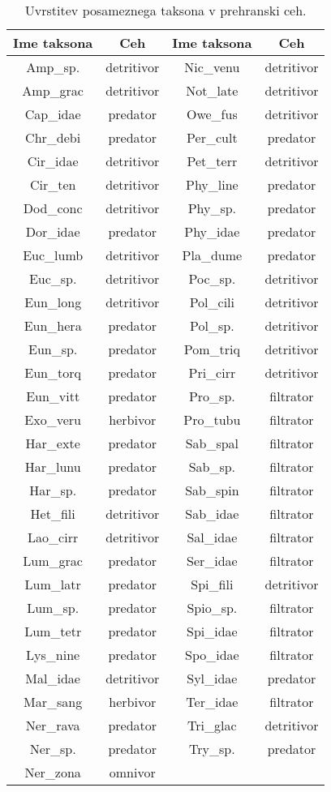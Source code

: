 \begin{table}[htb]\footnotesize
\begin{center}
\caption[Prehranski cehi]{Uvrstitev posameznega taksona v prehranski ceh.}
\label{tab:raw_cehi}
 \begin{tabular}{c c c c}
 \toprule
Ime taksona & Ceh & Ime taksona & Ceh \\
 \midrule
Amp\_sp. & detritivor & Nic\_venu & detritivor \\
Amp\_grac & detritivor & Not\_late & detritivor \\
Cap\_idae & predator & Owe\_fus &	detritivor \\
Chr\_debi & predator & Per\_cult & predator \\
Cir\_idae & detritivor & Pet\_terr & detritivor \\
Cir\_ten & detritivor & Phy\_line	& predator \\
Dod\_conc & detritivor & Phy\_sp.	& predator \\
Dor\_idae & predator & Phy\_idae & predator \\
Euc\_lumb & detritivor & Pla\_dume & predator \\
Euc\_sp. & detritivor & Poc\_sp. & detritivor \\
Eun\_long & detritivor & Pol\_cili & detritivor \\
Eun\_hera & predator & Pol\_sp. & detritivor \\
Eun\_sp. & predator & Pom\_triq & detritivor \\
Eun\_torq & predator & Pri\_cirr & detritivor \\
Eun\_vitt & predator & Pro\_sp. & filtrator \\
Exo\_veru & herbivor & Pro\_tubu & filtrator \\
Har\_exte & predator & Sab\_spal & filtrator \\
Har\_lunu & predator & Sab\_sp. & filtrator \\
Har\_sp. & predator	& Sab\_spin & filtrator \\
Het\_fili & detritivor & Sab\_idae & filtrator \\
Lao\_cirr & detritivor & Sal\_idae & filtrator \\
Lum\_grac & predator & Ser\_idae & filtrator \\
Lum\_latr & predator & Spi\_fili & detritivor \\
Lum\_sp. & predator & Spio\_sp. & filtrator \\
Lum\_tetr & predator & Spi\_idae & filtrator \\
Lys\_nine & predator & Spo\_idae & filtrator \\
Mal\_idae & detritivor & Syl\_idae & predator \\
Mar\_sang & herbivor & Ter\_idae & filtrator \\
Ner\_rava & predator & Tri\_glac & detritivor \\
Ner\_sp. & predator & Try\_sp. & predator \\
Ner\_zona & omnivor & & \\	
 \bottomrule
 \end{tabular}
 \end{center}
\end{table}


